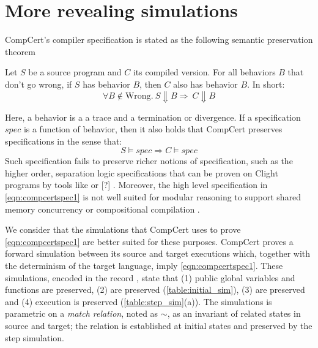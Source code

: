 \section{More revealing simulations}\label{sec:compcert-sim}

CompCert's compiler specification is stated as the following semantic preservation theorem

\begin{theorem}
Let $S$ be a source program and $C$ its compiled version. For all behaviors $B$ that don't go wrong, if $S$ has behavior $B$, then  
$C$ also has behavior $B$. In short:
\begin{equation}\forall B \not \in \text{Wrong}. \ S \Downarrow B \Rightarrow \ C \Downarrow B\label{eqn:compcertspec1}\end{equation}
\end{theorem}
Here, a behavior is a a trace and a termination or divergence. If a specification $spec$ is a function of behavior, then it also holds that CompCert preserves specifications in the sense that:
\begin{equation} S \models spec \Rightarrow C \models spec \end{equation}
Such specification fails to preserve richer notions of specification, such as the higher order, separation logic specifications that can be proven on Clight programs by tools like \cite{DBLP:journals/jar/CaoBGDA18} or [?]%
. Moreover, the high level specification in \autoref{eqn:compcertspec1} is not well suited for modular reasoning to support shared memory concurrency or compositional compilation \cite{compcomp}. 

We consider that the simulations that CompCert uses to prove \autoref{eqn:compcertspec1} are better suited for these purposes.
CompCert proves a forward simulation between its source and target executions which, together with the determinism of the target language, imply \autoref{eqn:compcertspec1}. These simulations, encoded in the record , state that (1) public global variables and functions are preserved, (2)  are preserved (\autoref{table:initial_sim}), (3)  are preserved and (4) execution is preserved (\autoref{table:step_sim}(a)). The simulations is parametric on a \emph{match relation}, noted as $\overset{ }{\sim}$, as an invariant of related states in source and target; the relation is established at initial states and preserved by the step simulation. 

